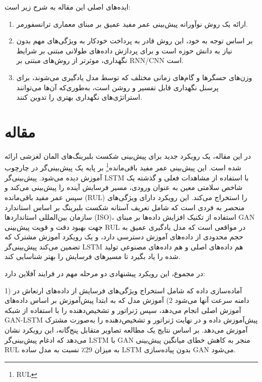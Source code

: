 \documentclass[a4paper,10pt]{article}
\begin{document}
ایده‌های اصلی این مقاله به شرح زیر است:
\begin{enumerate}
	\item ارائه یک روش نوآورانه پیش‌بینی عمر مفید عمیق بر مبنای معماری ترانسفورمر.
	\item بر اساس توجه به خود، این روش قادر به پرداخت خودکار به ویژگی‌های مهم بدون نیاز به دانش حوزه است و برای پردازش داده‌های طولانی مبتنی بر شرایط نگهداری، موثرتر از روش‌های مبتنی بر RNN/CNN است. 
	\item وزن‌های حسگرها و گام‌های زمانی مختلف که توسط مدل یادگیری می‌شوند، برای پرسنل نگهداری قابل تفسیر و روشن است، به‌طوری‌که آن‌ها می‌توانند استراتژی‌های نگهداری بهتری را تدوین کنند.
\end{enumerate}


	\section{مقاله \textcolor{blue}{\cite{article48}}}
در این مقاله، یک رویکرد جدید برای پیش‌بینی شکست بلبرینگ‌های المان لغزشی ارائه شده است. این پیش‌بینی عمر مفید باقی‌مانده\footnote{RUL} بر پایه یک پیش‌بینی‌گر  در چارچوب  آموزش دیده می‌شود. پیش‌بینی‌گر LSTM با استفاده از مشاهدات فعلی و گذشته یک شاخص سلامتی معین به عنوان ورودی، مسیر فرسایش آینده را پیش‌بینی می‌کند و سپس عمر مفید باقی‌مانده (RUL) را استخراج می‌کند. این رویکرد دارای ویژگی‌های منحصر به فردی است که شامل تعریف آستانه شکست بلبرینگ بر اساس استاندارد سازمان بین‌المللی استاندارد‌ها (ISO)، استفاده از تکنیک افزایش داده‌ها بر مبنای GAN جهت بهبود دقت و قویت پیش‌بینی RUL در مواقعی است که مدل یادگیری عمیق به حجم محدودی از داده‌های آموزش دسترسی دارد، و یک رویکرد آموزش مشترک که تضمین می‌کند پیش‌بینی‌گر LSTM هم داده‌های اصلی و هم داده‌های مصنوعی تولید شده را یاد بگیرد تا مسیرهای فرسایش را بهتر شناسایی کند.

در مجموع، این رویکرد پیشنهادی دو مرحله مهم در فرایند آفلاین دارد:

1) آماده‌سازی داده که شامل استخراج ویژگی‌های فرسایش از داده‌های ارتعاش در دامنه سرعت آنها می‌شود 2) آموزش مدل که به ابتدا پیش‌آموزش  بر اساس داده‌های آموزش اصلی انجام می‌دهد، سپس ژنراتور و تشخیص‌دهنده را با استفاده از شبکه GAN-LSTM پیش‌آموزش داده و در نهایت  ژنراتور و تشخیص‌دهنده را به‌صورت مشترک آموزش می‌دهد. بر اساس نتایج یک مطالعه تصاویر متقابل پنج‌گانه، این رویکرد نشان می‌دهد که ادغام پیش‌بینی‌گر LSTM با GAN منجر به کاهش خطای میانگین پیش‌بینی RUL به میزان 29٪ نسبت به مدل ساده LSTM بدون پیاده‌سازی GAN می‌شود.
\end{document}
